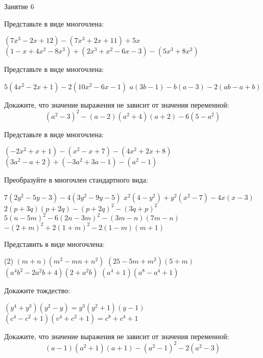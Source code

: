 \begin{class}[number=6]
	\begin{listofex}
		\item Занятие 6
	\end{listofex}
\end{class}

\begin{homework}[number=3]
	\begin{listofex}
	\item Представьте в виде многочлена:
	\begin{tasks} 
		\task \( (7x^3-2x+12)-(7x^3+2x+11)+5x \)
		\task \( (1-x+4x^2-8x^3)+(2x^3+x^2-6x-3)-(5x^3+8x^2) \)
	\end{tasks}
	\item Представьте в виде многочлена:
	\begin{tasks} 
		\task \( 5(4x^2-2x+1)-2(10x^2-6x-1) \)
		\task \( a(3b-1)-b(a-3)-2(ab-a+b) \)
	\end{tasks}
	\item Докажите, что значение выражения не зависит от значения переменной:
	\[ (a^2-3)^2-(a-2)(a^2+4)(a+2)-6(5-a^2) \]
	\end{listofex}
\end{homework}

\begin{class}[number=7]
	\begin{listofex}
	\item Представьте в виде многочлена:
	\begin{tasks} 
		\task \( (-2x^2+x+1)-(x^2-x+7)-(4x^2+2x+8) \)
		\task \( (3a^2-a+2)+(-3a^2+3a-1)-(a^2-1) \)
	\end{tasks}
	\item Преобразуйте в многочлен стандартного вида:
	\begin{tasks}
		\task \( 7(2y^2-5y-3)-4(3y^2-9y-5) \)
		\task \( x^2(4-y^2)+y^2(x^2-7)-4x(x-3) \)
		\task \( 2(p+3q)(p+2q)-(p+2q)^2-(3q+p)^2 \)
		\task \( 5(n-5m)^2-6(2n-3m)^2-(3m-n)(7m-n) \)
		\task \( -(2+m)^2+2(1+m)^2-2(1-m)(m+1) \)
	\end{tasks}
	\item Представить в виде многочлена:
	\begin{tasks}(2)
		\task \( (m+n)(m^2-mn+n^2) \)
		\task \( (25-5m+m^2)(5+m) \)
		\task \( (a^4b^2-2a^2b+4)(2+a^2b) \)
		\task \( (a^4+1)(a^8-a^4+1) \)
	\end{tasks}
	\item Докажите тождество:
	\begin{tasks}
		\task \( (y^4+y^3)(y^2-y)=y^3(y^2+1)(y-1) \)
		\task \( (c^4-c^2+1)(v^4+c^2+1)=c^8+c^4+1 \)
	\end{tasks}
	\item Докажите, что значение выражения не зависит от значения переменной:
	\[ (a-1)(a^2+1)(a+1)-(a^2-1)^2-2(a^2-3) \]
	\end{listofex}
\end{class}

